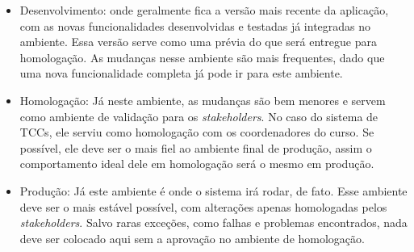 \begin{itemize}
    \item Desenvolvimento: onde geralmente fica a versão mais recente da aplicação, com as novas funcionalidades desenvolvidas e testadas já integradas no ambiente. Essa versão serve como uma prévia do que será entregue para homologação. As mudanças nesse ambiente são mais frequentes, dado que uma nova funcionalidade completa já pode ir para este ambiente.

    \item Homologação: Já neste ambiente, as mudanças são bem menores e servem como ambiente de validação para os \textit{stakeholders}. No caso do sistema de TCCs, ele serviu como homologação com os coordenadores do curso. Se possível, ele deve ser o mais fiel ao ambiente final de produção, assim o comportamento ideal dele em homologação será o mesmo em produção.

    \item Produção: Já este ambiente é onde o sistema irá rodar, de fato. Esse ambiente deve ser o mais estável possível, com alterações apenas homologadas pelos \textit{stakeholders}. Salvo raras exceções, como falhas e problemas encontrados, nada deve ser colocado aqui sem a aprovação no ambiente de homologação.
\end{itemize}